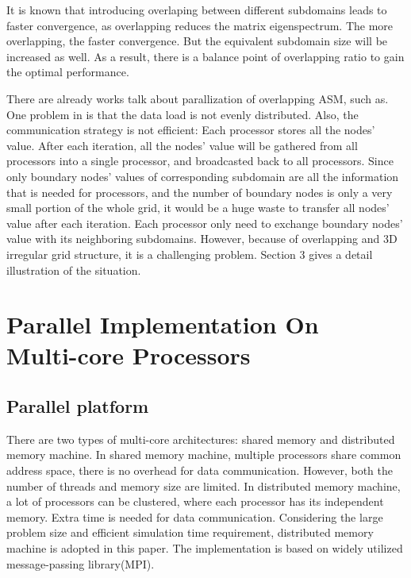 \documentclass{sig-alternate}
\begin{document}
	It is known that introducing overlaping between different subdomains leads to faster convergence, 
	as overlapping reduces the matrix eigenspectrum\cite{Klawonn, Taopeng}. The more overlapping, the faster convergence.
	But the equivalent subdomain size will  be increased as well. As a result, there is a balance point of overlapping ratio to 
	gain the optimal performance.
\begin{comment}
	SOR, PCG, MG methods can be combined with ASM to accelerate convergence. However, there are limitations of the resulting
	methods. SOR method is not 
	stable, as the optimal $w$ value depends on system matrix eigenvalues. It is hard to choose the optimal $w$ for large
	size problem, a bad $w$ value can even lead to divergence; MG may have
	error or even convergence problems, especially for 3D irregular grid; In PCG, a global
	matrix is required, which limits the maximum problem size that can be solved. 
\end{comment}
	There are already works talk about parallization of overlapping ASM, such as\cite{kaisun}. One problem in \cite{kaisun} is 
	that the
	data load is not evenly distributed. Also, the communication strategy is not efficient: Each processor stores all the nodes' 
	value. After each iteration, all the
	nodes' value will be gathered from all processors into a single processor, and broadcasted back to all processors. Since
	only boundary nodes' values of corresponding subdomain are all the information that is needed for processors, and the number of 
	boundary nodes is only a very small portion of the whole grid, it would be a huge waste to transfer all nodes' value 
	after each iteration. Each processor only need to exchange boundary nodes' value with its neighboring subdomains.
	However, because of overlapping and 3D irregular grid structure, it is a challenging problem. Section 3
	gives a detail illustration of the situation.
 
\section{Parallel Implementation On \\Multi-core Processors}
  \subsection{Parallel platform}
	There are two types of multi-core architectures: shared memory and distributed memory machine. In shared memory machine, 
	multiple processors share common address space, there is no overhead for data communication. However, both the number
	of threads and memory size are limited. In distributed 
	memory machine, a lot of processors can be clustered, where each processor has its independent memory. Extra time 
	is needed for data communication. Considering the large problem 
	size and efficient simulation time requirement, distributed memory machine is adopted in this paper. The implementation is based
	on widely utilized message-passing library(MPI).
\end{document}
